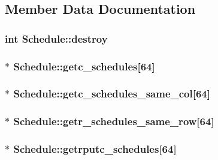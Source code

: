 \subsection{Member Data Documentation}
\hypertarget{structSchedule_ab2823b4aae65c91dc839a8ac5e221fe2}{
\subsubsection[{destroy}]{\setlength{\rightskip}{0pt plus 5cm}int {\bf Schedule::destroy}}}
\label{structSchedule_ab2823b4aae65c91dc839a8ac5e221fe2}
\hypertarget{structSchedule_a9a2133b07eddab8481c2813822c21616}{
\subsubsection[{getc\_\-schedules}]{$\ast$ {\bf Schedule::getc\_\-schedules}\mbox{[}64\mbox{]}}}
\label{structSchedule_a9a2133b07eddab8481c2813822c21616}
\hypertarget{structSchedule_adb30896fefb80804c9cbfb3938f71e97}{
\subsubsection[{getc\_\-schedules\_\-same\_\-col}]{$\ast$ {\bf Schedule::getc\_\-schedules\_\-same\_\-col}\mbox{[}64\mbox{]}}}
\label{structSchedule_adb30896fefb80804c9cbfb3938f71e97}
\hypertarget{structSchedule_ad7ae6c863963c88a05d5ea245c772752}{
\subsubsection[{getr\_\-schedules\_\-same\_\-row}]{$\ast$ {\bf Schedule::getr\_\-schedules\_\-same\_\-row}\mbox{[}64\mbox{]}}}
\label{structSchedule_ad7ae6c863963c88a05d5ea245c772752}
\hypertarget{structSchedule_a663d74ed3015c0ca66a39a4927d9a843}{
\subsubsection[{getrputc\_\-schedules}]{$\ast$ {\bf Schedule::getrputc\_\-schedules}\mbox{[}64\mbox{]}}}
